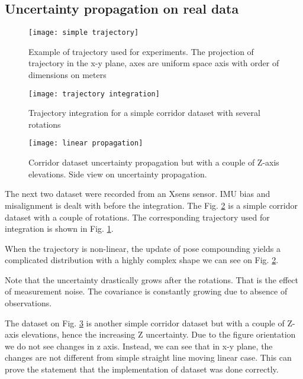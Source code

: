 \documentclass{article}
\begin{document}
\subsection{Uncertainty propagation on real data}

\begin{figure}
	\texttt{[image: simple trajectory]}
	
	\caption{Example of trajectory used for experiments. The projection of trajectory in the x-y plane, axes are uniform space axis with order of dimensions on meters}
	\label{fig:simple-trajectory}
\end{figure}

\begin{figure}
	\texttt{[image: trajectory integration]}
	
	\caption{Trajectory integration for a simple corridor dataset with several rotations}
	\label{fig:trajectory-integration}
\end{figure}

\begin{figure}
	\texttt{[image: linear propagation]}
	
	\caption{Corridor dataset uncertainty propagation but with a couple of Z-axis elevations. Side view on uncertainty propagation.}
	\label{fig:linear-propagation}
\end{figure}

The next two dataset were recorded from an Xsens sensor. IMU bias and misalignment is dealt with before the integration.  
The Fig. \ref{fig:trajectory-integration} is a simple corridor dataset with a couple of rotations. The corresponding trajectory used for integration is shown in Fig. \ref{fig:simple-trajectory}.

When the trajectory is non-linear, the update of pose compounding yields a complicated distribution with a highly complex shape we can see on Fig. \ref{fig:trajectory-integration}. 

Note that the uncertainty drastically grows after the rotations. That is the effect of measurement noise. The covariance is constantly growing due to absence of observations. 

The dataset on Fig. \ref{fig:linear-propagation} is another simple corridor dataset but with a couple of Z-axis elevations, hence the increasing Z uncertainty. Due to the figure orientation we do not see changes in z axis. Instead, we can see that in x-y plane, the changes are not different from simple straight line moving linear case. This can prove the statement that the implementation of dataset was done correctly.
\end{document}
